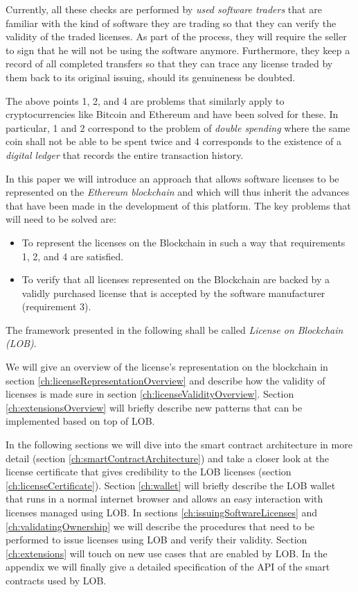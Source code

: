 \documentclass[a4paper]{article}
\begin{document}
Currently, all these checks are performed by \emph{used software traders} that are familiar with the kind of software they are trading so that they can verify the validity of the traded licenses. As part of the process, they will require the seller to sign that he will not be using the software anymore. Furthermore, they keep a record of all completed transfers so that they can trace any license traded by them back to its original issuing, should its genuineness be doubted. 

The above points 1, 2, and 4 are problems that similarly apply to cryptocurrencies like Bitcoin and Ethereum and have been solved for these. In particular, 1 and 2 correspond to the problem of \emph{double spending} where the same coin shall not be able to be spent twice and 4 corresponds to the existence of a \emph{digital ledger} that records the entire transaction history.

In this paper we will introduce an approach that allows software licenses to be represented on the \emph{Ethereum blockchain} and which will thus inherit the advances that have been made in the development of this platform. The key problems that will need to be solved are:
\begin{itemize}
  \item To represent the licenses on the Blockchain in such a way that requirements 1, 2, and 4 are satisfied.
  \item To verify that all licenses represented on the Blockchain are backed by a validly purchased license that is accepted by the software manufacturer (requirement 3).
\end{itemize}

The framework presented in the following shall be called \emph{License on Blockchain (LOB)}. 

We will give an overview of the license's representation on the blockchain in section \ref{ch:licenseRepresentationOverview} and describe how the validity of licenses is made sure in section \ref{ch:licenseValidityOverview}. Section \ref{ch:extensionsOverview} will briefly describe new patterns that can be implemented based on top of LOB.

In the following sections we will dive into the smart contract architecture in more detail (section \ref{ch:smartContractArchitecture}) and take a closer look at the license certificate that gives credibility to the LOB licenses (section \ref{ch:licenseCertificate}). Section \ref{ch:wallet} will briefly describe the LOB wallet that runs in a normal internet browser and allows an easy interaction with licenses managed using LOB. In sections \ref{ch:issuingSoftwareLicenses} and \ref{ch:validatingOwnership} we will describe the procedures that need to be performed to issue licenses using LOB and verify their validity. Section \ref{ch:extensions} will touch on new use cases that are enabled by LOB. In the appendix we will finally give a detailed specification of the API of the smart contracts used by LOB.
\end{document}
